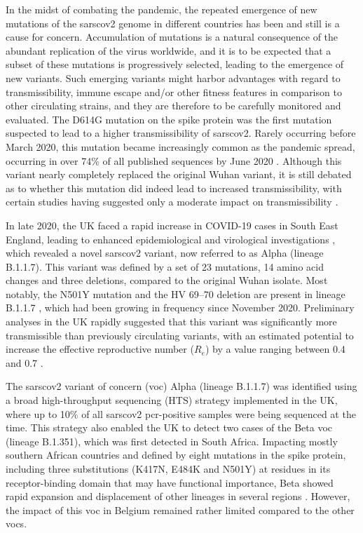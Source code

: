 In the midst of combating the pandemic, the repeated emergence of new mutations of the \gls{sarscov2} genome in different countries has been and still is a cause for concern.
Accumulation of mutations is a natural consequence of the abundant replication of the virus worldwide, and it is to be expected that a subset of these mutations is progressively selected, leading to the emergence of new variants.
Such emerging variants might harbor advantages with regard to transmissibility, immune escape and/or other fitness features in comparison to other circulating strains, and they are therefore to be carefully monitored and evaluated.
The D614G mutation on the spike protein was the first mutation suspected to lead to a higher transmissibility of \gls{sarscov2}.
Rarely occurring before March 2020, this mutation became increasingly common as the pandemic spread, occurring in over 74\% of all published sequences by June 2020 \citep{korber2020tracking,plante2021spike}.
Although this variant nearly completely replaced the original Wuhan variant, it is still debated as to whether this mutation did indeed lead to increased transmissibility, with certain studies having suggested only a moderate impact on transmissibility \citep{cogUKreport1,volz2021evaluating}.

In late 2020, the UK faced a rapid increase in COVID-19 cases in South East England, leading to enhanced epidemiological and virological investigations \citep{cogUKreport1}, which revealed a novel \gls{sarscov2} variant, now referred to as Alpha (lineage B.1.1.7).
This variant was defined by a set of 23 mutations, 14 amino acid changes and three deletions, compared to the original Wuhan isolate.
Most notably, the N501Y mutation and the HV 69--70 deletion are present in lineage B.1.1.7 \citep{rambaut2020dynamic}, which had been growing in frequency since November 2020.
Preliminary analyses in the UK rapidly suggested that this variant was significantly more transmissible than previously circulating variants, with an estimated potential to increase the effective reproductive number ($R_e$) by a value ranging between 0.4 and 0.7 \citep{volz2021assessing}.

The \gls{sarscov2} variant of concern (\gls{voc}) Alpha (lineage B.1.1.7) was identified using a broad high-throughput sequencing (HTS) strategy implemented in the UK, where up to 10\% of all \gls{sarscov2} \gls{pcr}-positive samples were being sequenced at the time.
This strategy also enabled the UK to detect two cases of the Beta \gls{voc} (lineage B.1.351), which was first detected in South Africa.
Impacting mostly southern African countries and defined by eight mutations in the spike protein, including three substitutions (K417N, E484K and N501Y) at residues in its receptor-binding domain that may have functional importance, Beta showed rapid expansion and displacement of other lineages in several regions \citep{tegally2021detection}.
However, the impact of this \gls{voc} in Belgium remained rather limited compared to the other \gls{voc}s.

